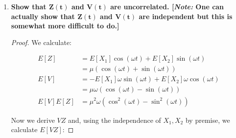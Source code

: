 \documentclass[10pt, oneside]{article}
\begin{document}
\begin{enumerate}[label=9.\arabic*]
\begin{enumerate}
	\begin{align*}
	Q(v) = P(V \leq v) &= P(-X_1 \omega \sin(\omega t) + X_2 \omega \cos(\omega t) \leq v) \\
	&= \int^{+\infty}_{-\infty} P \bigg( X_2 \leq \frac{v + x_1 \omega \sin(\omega t)}{\omega \cos(\omega t)} \bigg| x_1 \bigg) g(x_1) \ dx_1 \\
	&= \int^{+\infty}_{-\infty} H \bigg( \frac{v + x_1 \omega \sin(\omega t)}{\omega \cos(\omega t)} \bigg| x_1 \bigg) g(x_1) \ dx_1 \\
	\frac{d Q(v)}{dv} = q(v) &= \frac{1}{\omega \cos(\omega t)} \int^{+\infty}_{-\infty} h \bigg( \frac{v + x_1 \omega \sin(\omega t)}{\omega \cos(\omega t)} \bigg| x_1 \bigg) g(x_1) \ dx_1
	\end{align*}
	
	Proceeding with the evaluation of the integral yields
	
	\[ \boxed{ q(v) = \frac{1}{\sqrt{2\pi} \sigma \omega} \exp \bigg[ -\frac{1}{2} \bigg( \frac{v - \mu \omega (\cos(\omega t) - \sin(\omega t))}{\sigma \omega} \bigg)^2 \bigg], \forall t \in \mathbb{R}, -\infty < v < +\infty } \]
	
	\textbf{Note:} We must impose the constraint that $\omega > 0$.
	
	\item  \begin{tcolorbox}[
	  colback=Cerulean!5!white,
	  colframe=Cerulean!75!black]
	\textbf{Show that $\bm{Z(t)}$ and $\bm{V(t)}$ are uncorrelated. [\textit{Note:} One can actually show that $\bm{Z(t)}$ and $\bm{V(t)}$ are independent but this is somewhat more difficult to do.] }
	\end{tcolorbox}
	
	\begin{proof}
	We calculate:
	
	\begin{align*}
	E[Z] &= E[X_1] \cos (\omega t) + E[X_2] \sin (\omega t) \\
	&= \mu( \cos (\omega t) + \sin (\omega t) ) \\
	E[V] &= -E[X_1] \omega \sin (\omega t) + E[X_2] \omega  \cos (\omega t) \\
	&= \mu \omega ( \cos (\omega t) - \sin (\omega t) ) \\
	E[V]E[Z] &= \mu^2 \omega (\cos^2 (\omega t) - \sin^2 (\omega t))
	\end{align*}
	
	Now we derive $VZ$ and, using the independence of $X_1, X_2$ by premise, we calculate $E[VZ]$:
	

\end{proof}
\end{enumerate}
\end{enumerate}
\end{document}
